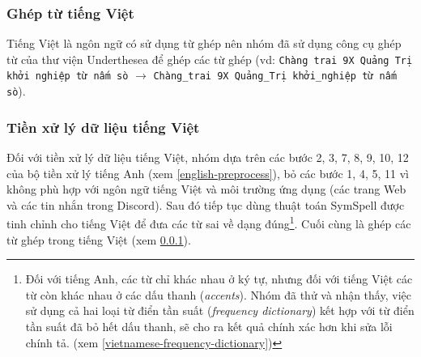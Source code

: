 \subsubsection{Ghép từ tiếng Việt}\label{compound-words}
Tiếng Việt là ngôn ngữ có sử dụng từ ghép nên nhóm đã sử dụng công cụ ghép từ của thư viện Underthesea để ghép các từ ghép (vd: \texttt{Chàng trai 9X Quảng Trị khởi nghiệp từ nấm sò} $\to$ \texttt{Chàng\_trai 9X Quảng\_Trị khởi\_nghiệp từ nấm sò}).

\subsubsection{Tiền xử lý dữ liệu tiếng Việt}
Đối với tiền xử lý dữ liệu tiếng Việt, nhóm dựa trên các bước 2, 3, 7, 8, 9, 10, 12 của bộ tiền xử lý tiếng Anh (xem \ref{english-preprocess}), bỏ các bước 1, 4, 5, 11 vì không phù hợp với ngôn ngữ tiếng Việt và môi trường ứng dụng (các trang Web và các tin nhắn trong Discord). Sau đó tiếp tục dùng thuật toán SymSpell được tinh chỉnh cho tiếng Việt để đưa các từ sai về dạng đúng\footnote{Đối với tiếng Anh, các từ chỉ khác nhau ở ký tự, nhưng đối với tiếng Việt các từ còn khác nhau ở các dấu thanh (\textit{accents}). Nhóm đã thử và nhận thấy, việc sử dụng cả hai loại từ điển tần suất (\textit{frequency dictionary}) kết hợp với từ điển tần suất đã bỏ hết dấu thanh, sẽ cho ra kết quả chính xác hơn khi sửa lỗi chính tả. (xem \ref{vietnamese-frequency-dictionary})}. Cuối cùng là ghép các từ ghép trong tiếng Việt (xem \ref{compound-words}).
